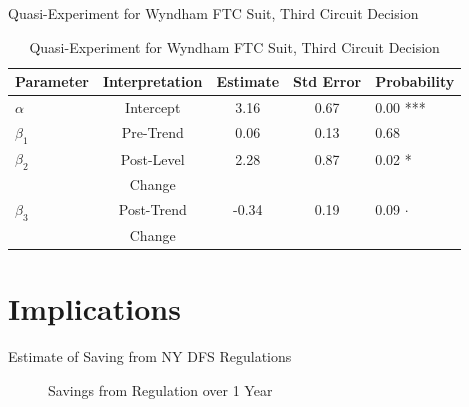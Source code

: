 \documentclass[10pt]{beamer}
\begin{document}
\begin{frame}{Quasi-Experiment for Wyndham FTC Suit, Third Circuit Decision}
\begin{table}[!htb]
    \caption{Quasi-Experiment for Wyndham FTC Suit, Third Circuit Decision}
    \label{tab:FTC_Wyndham2}
    \begin{tabular}{l|c|c|c|l}
      \textbf{Parameter} & \textbf{Interpretation} & \textbf{Estimate} & \textbf{Std Error} & \textbf{Probability}\\ %
      \hline
      $\alpha$ & Intercept & 3.16 &  0.67 &  0.00 *** \\  \hline %
      $\beta_1$ & Pre-Trend & 0.06 & 0.13 & 0.68  \\  \hline %
      $\beta_2$ & Post-Level & 2.28 & 0.87 & 0.02 * \\ %
      & Change & & & \\ \hline
      $\beta_3$ & Post-Trend & -0.34 & 0.19 & 0.09 $\cdot$ \\ %
      & Change & & & \\
    \end{tabular}
\end{table}
\end{frame}

\section{Implications}

\begin{frame}{Estimate of Saving from NY DFS Regulations}
    \begin{figure}
      \caption{Savings from Regulation over 1 Year} \label{fig:savings_est}
    \centering
\end{figure}
\end{frame}
\end{document}
